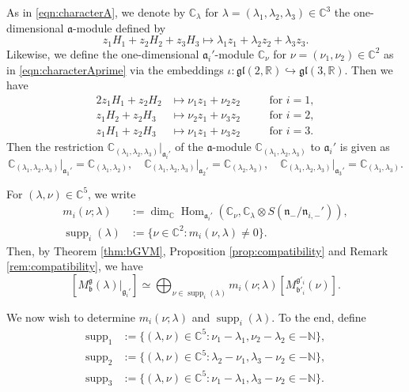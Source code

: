 \documentclass[a4paper,11pt,reqno]{amsart}
\newcommand{\fraka}{\mathfrak{a}}
\newcommand{\frakg}{\mathfrak{g}}
\newcommand{\frakn}{\mathfrak{n}}
\newcommand{\CC}{\mathbb{C}}
\newcommand{\RR}{\mathbb{R}}
\newcommand{\0}{{\bf 0}}
\newcommand{\N}{\mathbb{N}}
\newcommand{\C}{\mathbb{C}}
\newcommand{\1}{{\bf 1}}
\DeclareMathOperator{\Hom}{Hom}
\newcommand{\frakb}{{\mathfrak b}}
\DeclareMathOperator{\supp}{supp}
\newcommand{\Mb}{M^{\frakg}_{\frakb}}
\theoremstyle{plain}
\theoremstyle{definition}
\numberwithin{equation}{section}
\theoremstyle{definition}
\begin{document}
As in \eqref{eqn:characterA}, we denote by $\C_{\lambda}$ for 
$\lambda=(\lambda_1,\lambda_2,\lambda_3) \in \C^3$
the one-dimensional $\fraka$-module defined by
\begin{equation*}
z_1 H_1 + z_2 H_2 + z_3H_3 
\longmapsto \lambda_1z_1 + \lambda_2z_2  +\lambda_3 z_3.
\end{equation*}
Likewise, we define the one-dimensional 
$\fraka_i'$-module $\C_{\nu}$ for $\nu=(\nu_1,\nu_2) \in \C^2$
as in \eqref{eqn:characterAprime} via the embeddings 
$\iota\colon \mathfrak{gl}(2,\RR) \hookrightarrow \mathfrak{gl}(3,\RR)$.
Then we have 
\begin{alignat*}{2}
z_1 H_1 + z_2 H_2  
&\longmapsto \nu_1z_1 + \nu_2 z_2 &&\quad \text{for $i=1$},\\[3pt]
z_1 H_2 + z_2 H_3  
&\longmapsto \nu_2 z_1 + \nu_3 z_2 &&\quad \text{for $i=2$},\\[3pt]
z_1 H_1 + z_2 H_3  
&\longmapsto \nu_1 z_1 + \nu_3 z_2 &&\quad \text{for $i=3$}.
\end{alignat*}
Then the restriction $\C_{(\lambda_1,\lambda_2,\lambda_3)}\vert_{\fraka_i'}$
of the $\fraka$-module $\C_{(\lambda_1,\lambda_2,\lambda_3)}$
to $\fraka_i'$ is given as
\begin{equation}\label{eqn:restriction_to_ai}
\C_{(\lambda_1, \lambda_2,\lambda_3)}\vert_{\fraka_1'} = \C_{(\lambda_1,\lambda_2)},
\quad
\C_{(\lambda_1, \lambda_2,\lambda_3)}\vert_{\fraka_2'} = \C_{(\lambda_2,\lambda_3)},
\quad
\C_{(\lambda_1, \lambda_2,\lambda_3)}\vert_{\fraka_3'} = \C_{(\lambda_1,\lambda_3)}.
\end{equation}


For $(\lambda,\nu) \in \C^5$, we write
\begin{align}
m_i(\nu;\lambda)&:=
\dim_\CC \Hom_{\fraka_i'}(\C_\nu, \C_\lambda \otimes 
S(\frakn_-/\frakn_{i,-}')),\label{eqn:mult_i}\\[3pt]
\supp_i(\lambda)&:=\{\nu \in \CC^2 : m_i(\nu,\lambda)\neq 0\}.\nonumber
\end{align}
Then, 
by Theorem \ref{thm:bGVM},
Proposition \ref{prop:compatibility} and
Remark \ref{rem:compatibility},
we have 
\begin{equation}\label{eqn:bGVM2}
[\Mb(\lambda)\vert_{\frakg_i'}]
\simeq 
\bigoplus_{\nu \in \supp_i(\lambda)}
m_i(\nu; \lambda) [M^{\frakg'_i}_{\frakb'_i}(\nu)].
\end{equation}

We now wish to determine $m_i(\nu; \lambda)$ and $\supp_i(\lambda)$. 
To the end, define
\begin{align}
\supp_{1} &:= \{(\lambda, \nu) \in \C^5: 
\nu_1-\lambda_1,\nu_2-\lambda_2 \in -\N\},\nonumber\\[3pt]
\supp_{2} &:= \{(\lambda, \nu) \in \C^5: 
\lambda_2-\nu_1,\lambda_3-\nu_2 \in -\N\},\label{eqn:supp_i}\\[3pt]
\supp_{3} &:= \{(\lambda, \nu) \in \C^5: 
\nu_1-\lambda_1, \lambda_3-\nu_2 \in -\N\}.\nonumber
\end{align}
\end{document}
